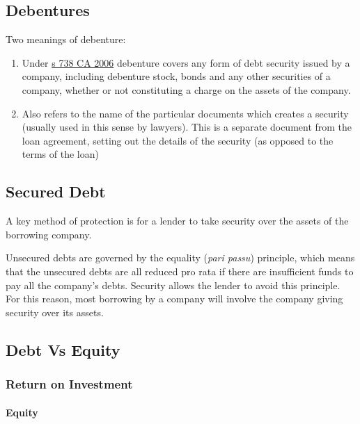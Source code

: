 \documentclass[
]{article}
\providecommand{\tightlist}{%
  \setlength{\itemsep}{0pt}\setlength{\parskip}{0pt}}
\begin{document}
\hypertarget{debentures}{%
\subsection{Debentures}\label{debentures}}

Two meanings of debenture:

\begin{enumerate}
\def\labelenumi{\arabic{enumi}.}
\tightlist
\item
  Under
  \href{https://www.legislation.gov.uk/ukpga/2006/46/section/738}{s 738
  CA 2006} debenture covers any form of debt security issued by a
  company, including debenture stock, bonds and any other securities of
  a company, whether or not constituting a charge on the assets of the
  company.
\item
  Also refers to the name of the particular documents which creates a
  security (usually used in this sense by lawyers). This is a separate
  document from the loan agreement, setting out the details of the
  security (as opposed to the terms of the loan)
\end{enumerate}

\hypertarget{secured-debt}{%
\subsection{Secured Debt}\label{secured-debt}}

A key method of protection is for a lender to take security over the
assets of the borrowing company.

Unsecured debts are governed by the equality (\emph{pari passu})
principle, which means that the unsecured debts are all reduced pro rata
if there are insufficient funds to pay all the company's debts. Security
allows the lender to avoid this principle. For this reason, most
borrowing by a company will involve the company giving security over its
assets.

\hypertarget{debt-vs-equity}{%
\subsection{Debt Vs Equity}\label{debt-vs-equity}}

\hypertarget{return-on-investment}{%
\subsubsection{Return on Investment}\label{return-on-investment}}

\hypertarget{equity}{%
\paragraph{Equity}\label{equity}}
\end{document}
